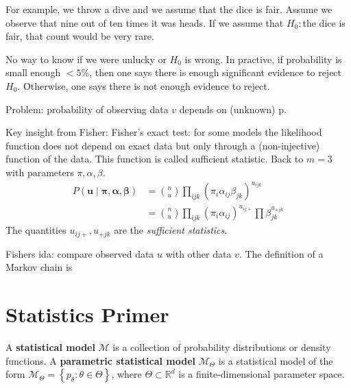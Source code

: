 \documentclass[a4paper, 11pt]{article}
\begin{document}
For example, we throw a dive and we assume that the dice is fair. Assume we observe that nine out of ten times it was heads. If we assume that \( H_0: \)the dice is fair, that count would be very rare.

No way to know if we were unlucky or \( H_0 \) is wrong. In practive, if probability is small enough \( < 5 \% \), then one says there is enough significant evidence to reject \( H_0 \). Otherwise, one says there is not enough evidence to reject.

Problem: probability of observing data \( v \) depends on (unknown) p.

Key insight from Fisher: Fisher's exact test: for some models the likelihood function does not depend on exact data but only through a (non-injective) function of the data. This function is called sufficient statistic. Back to \( m=3 \) with parameters \( \pi, \alpha, \beta \).
\begin{align*}
  P (\mathbf u \mid \pmb \pi, \pmb \alpha,\pmb \beta)  &=  {n \choose u} \prod_{ijk} (\pi_i \alpha_{ij} \beta_{jk})^{u_{ijk}} \\ 
  &= {n \choose u} \prod_{ijk} (\pi_i \alpha_{ij})^{u_{ij+}} \prod \beta_{jk}^{u_{+jk}}
\end{align*}
The quantities \( u_{ij+}, u_{+jk} \) are the \emph{sufficient statistics}.

Fishers ida: compare observed data \( u \) with other data \( v \). The definition of a Markov chain is 

\clearpage



\clearpage




\clearpage


\clearpage
\section{Statistics Primer}


\begin{defi}
  A \textbf{statistical model} \( \mathcal{M} \) is a collection of probability distributions or density functions. A \textbf{parametric statistical model} \( \mathcal{M}_{\Theta} \) is a statistical model of the form \( \mathcal{M}_{\Theta} = \left\{ p_\theta : \theta \in \Theta \right\} \), where \( \Theta \subset \mathbb R^d \) is a finite-dimensional parameter space.
\end{defi}
\end{document}
